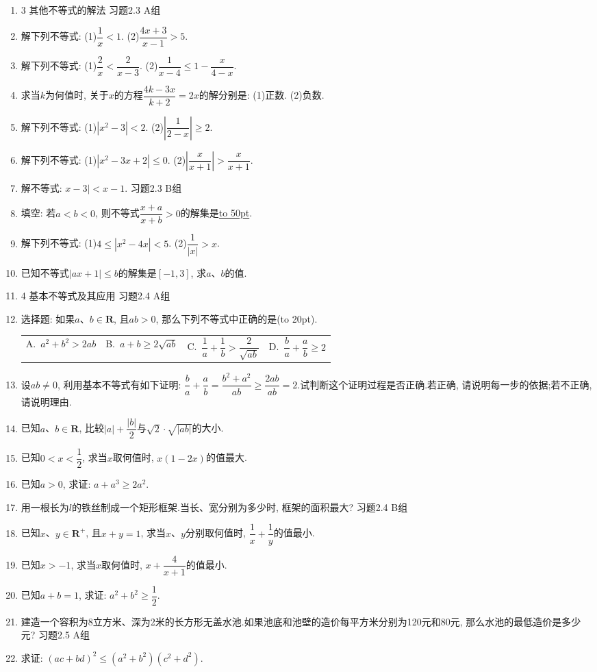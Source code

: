 \documentclass[10pt,a4paper]{article}
\newcommand{\blank}[1]{\underline{\hbox to #1pt{}}}
\newcommand{\bracket}[1]{(\hbox to #1pt{})}
\newcommand{\fourch}[4]{\par\begin{tabular}{p{.23\textwidth}p{.23\textwidth}p{.23\textwidth}p{.23\textwidth}}
A.~#1 &B.~#2& C.~#3& D.~#4
\end{tabular}}
\begin{document}
\begin{enumerate}[1.]
\item 3  其他不等式的解法
习题2.3  A组
\item 解下列不等式:
(1)$\dfrac 1x<1$.				(2)$\dfrac{4x+3}{x-1}>5$.
\item 解下列不等式:
(1)$\dfrac 2x<\dfrac 2{x-3}$.				(2)$\dfrac 1{x-4}\le 1-\dfrac x{4-x}$.
\item 求当$k$为何值时, 关于$x$的方程$\dfrac{4k-3x}{k+2}=2x$的解分别是:
(1)正数.					(2)负数.
\item 解下列不等式:
(1)$|x^2-3|<2$.				(2)$|\dfrac 1{2-x}|\ge 2$.
\item 解下列不等式:
(1)$|x^2-3x+2|\le 0$.			(2)$|\dfrac x{x+1}|>\dfrac x{x+1}$.
\item 解不等式: $x-3|<x-1$.
习题2.3  B组
\item 填空:
若$a<b<0$, 则不等式$\dfrac{x+a}{x+b}>0$的解集是\blank{50}.
\item 解下列不等式:
(1)$4\le|x^2-4x|<5$.			(2)$\dfrac 1{|x|}>x$.
\item 已知不等式$|ax+1|\le b$的解集是$[-1,3]$, 求$a$、$b$的值.
\item 4 基本不等式及其应用
习题2.4  A组
\item 选择题:
如果$a$、$b\in \mathbf{R}$, 且$ab>0$, 那么下列不等式中正确的是\bracket{20}.
\fourch{$a^2+b^2>2ab$}{$a+b\ge 2\sqrt {ab}$}{$\dfrac 1a+\dfrac 1b>\dfrac 2{\sqrt {ab}}$}{$\dfrac ba+\dfrac ab\ge 2$}
\item 设$ab\ne 0$, 利用基本不等式有如下证明: $\dfrac ba+\dfrac ab=\dfrac{{b^2}+{a^2}}{ab}\ge \dfrac{2ab}{ab}=2$.试判断这个证明过程是否正确.若正确, 请说明每一步的依据;若不正确, 请说明理由.
\item 已知$a$、$b\in \mathbf{R}$, 比较$|a|+\dfrac{|b|}2$与$\sqrt 2\cdot \sqrt {|ab|}$的大小.
\item 已知$0<x<\dfrac 12$, 求当$x$取何值时, $x(1-2x)$的值最大.
\item 已知$a>0$, 求证: $a+a^3\ge 2a^2$.
\item 用一根长为$l$的铁丝制成一个矩形框架.当长、宽分别为多少时, 框架的面积最大?
习题2.4  B组
\item 已知$x$、$y\in \mathbf{R}^+$, 且$x+y=1$, 求当$x$、$y$分别取何值时, $\dfrac 1x+\dfrac 1y$的值最小.
\item 已知$x>-1$, 求当$x$取何值时, $x+\dfrac 4{x+1}$的值最小.
\item 已知$a+b=1$, 求证: $a^2+b^2\ge \dfrac 12$.
\item 建造一个容积为8立方米、深为2米的长方形无盖水池.如果池底和池壁的造价每平方米分别为120元和80元, 那么水池的最低造价是多少元?
习题2.5  A组
\item 求证: $(ac+bd)^2\le (a^2+b^2)(c^2+d^2)$.

\end{enumerate}
\end{document}
